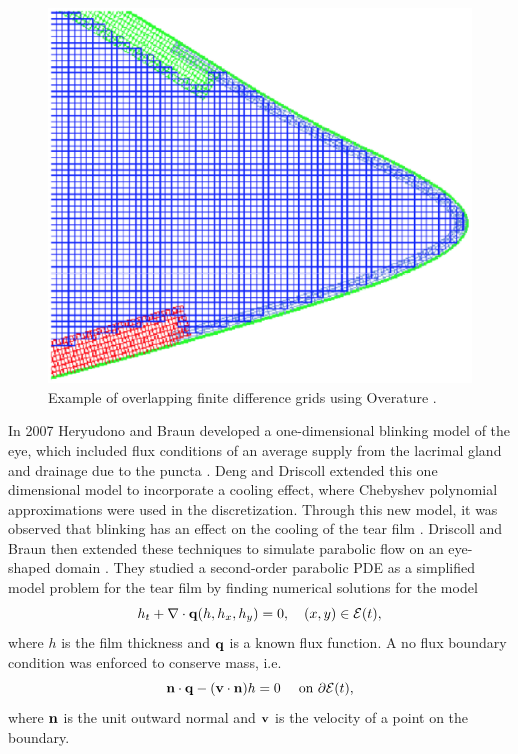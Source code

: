 \begin{figure}
	\centering
	\includegraphics[scale=0.6]{Chapter4/overature_eye}
	\caption{Example of overlapping finite difference grids using Overature \cite{maki2010tear}. }
	\label{overature_eye}
\end{figure}


In 2007 Heryudono and Braun developed a one-dimensional blinking model of the eye, which included flux conditions of an average supply from the lacrimal gland and drainage due to the puncta \cite{heryudono2007single}. Deng and Driscoll extended this one dimensional model to incorporate a cooling effect, where Chebyshev polynomial approximations were used in the discretization. Through this new model, it was observed that blinking has an effect on the cooling of the tear film \cite{deng2013model,deng2014heat}. Driscoll and Braun then extended these techniques to simulate parabolic flow on an eye-shaped domain \cite{driscoll2018simulation}. They studied a second-order parabolic PDE as a simplified model problem for the tear film by finding numerical solutions for the model
\begin{equation}
\label{driscollPDE}
h_t + \nabla \cdot \mathbf{q} (h,h_x,h_y)=0, \quad (x,y) \in \mathcal{E}(t),
\end{equation}
where $h$ is the film thickness and $\mathbf{q}$ is a known flux function. A no flux boundary condition was enforced to conserve mass, i.e.
\begin{equation}
\mathbf{n} \cdot \mathbf{q} - (\mathbf{v} \cdot \mathbf{n}) h =0 \quad \text{ on } \partial \mathcal{E}(t),
\end{equation}
where $\mathbf{n}$ is the unit outward normal and $\mathbf{v}$ is the velocity of a point on the boundary.

